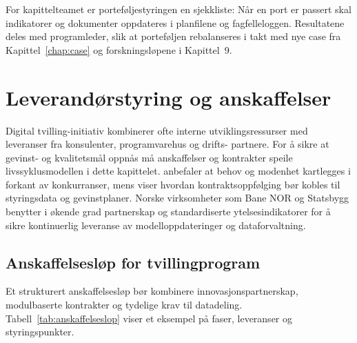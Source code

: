 For kapittelteamet er porteføljestyringen en sjekkliste: Når en port er passert skal indikatorer og dokumenter oppdateres i planfilene og fagfelleloggen. Resultatene deles med programleder, slik at porteføljen rebalanseres i takt med nye case fra Kapittel~\ref{chap:case} og forskningsløpene i Kapittel~9.

\section{Leverandørstyring og anskaffelser}
Digital tvilling-initiativ kombinerer ofte interne utviklingsressurser med leveranser fra konsulenter, programvarehus og drifts-
partnere. For å sikre at gevinst- og kvalitetsmål oppnås må anskaffelser og kontrakter speile livssyklusmodellen i dette kapittelet.
\citet{dfo2023anskaffelser} anbefaler at behov og modenhet kartlegges i forkant av konkurranser, mens \citet{dfo2024kontraktsoppfolging}
viser hvordan kontraktsoppfølging bør kobles til styringsdata og gevinstplaner. Norske virksomheter som Bane NOR og Statsbygg
benytter i økende grad partnerskap og standardiserte ytelsesindikatorer for å sikre kontinuerlig leveranse av modelloppdateringer
og dataforvaltning.\citep{statsbygg2023digitalmodenhet,banenor2024leverandor}

\subsection*{Anskaffelsesløp for tvillingprogram}
Et strukturert anskaffelsesløp bør kombinere innovasjonspartnerskap, modulbaserte kontrakter og tydelige krav til datadeling.
Tabell~\ref{tab:anskaffelseslop} viser et eksempel på faser, leveranser og styringspunkter.

